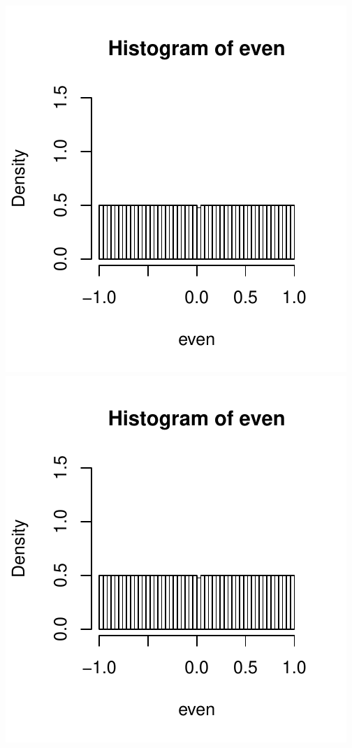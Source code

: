 \documentclass[12pt]{article}
\numberwithin{equation}{subsection}
\begin{document}
\begin{samepage}
\includegraphics[page=3]{dists.pdf}
\includegraphics[page=4]{dists.pdf}

\end{samepage}
\end{document}
